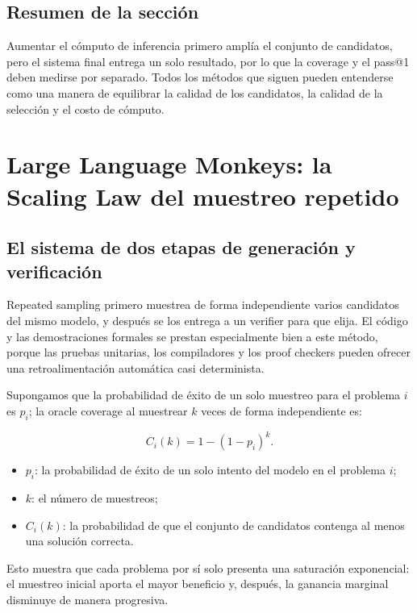 \documentclass[a4paper]{article}
\begin{document}
\subsection{Resumen de la sección}

Aumentar el cómputo de inferencia primero amplía el conjunto de candidatos, pero el sistema final entrega un solo resultado, por lo que la coverage y el pass@1 deben medirse por separado. Todos los métodos que siguen pueden entenderse como una manera de equilibrar la calidad de los candidatos, la calidad de la selección y el costo de cómputo.

\section{Large Language Monkeys: la Scaling Law del muestreo repetido}

\subsection{El sistema de dos etapas de generación y verificación}

Repeated sampling primero muestrea de forma independiente varios candidatos del mismo modelo, y después se los entrega a un verifier para que elija. El código y las demostraciones formales se prestan especialmente bien a este método, porque las pruebas unitarias, los compiladores y los proof checkers pueden ofrecer una retroalimentación automática casi determinista.


Supongamos que la probabilidad de éxito de un solo muestreo para el problema $i$ es $p_i$; la oracle coverage al muestrear $k$ veces de forma independiente es:

$$
C_i(k)=1-(1-p_i)^k.
$$

\begin{itemize}
    \item $p_i$: la probabilidad de éxito de un solo intento del modelo en el problema $i$;
    \item $k$: el número de muestreos;
    \item $C_i(k)$: la probabilidad de que el conjunto de candidatos contenga al menos una solución correcta.
\end{itemize}

Esto muestra que cada problema por sí solo presenta una saturación exponencial: el muestreo inicial aporta el mayor beneficio y, después, la ganancia marginal disminuye de manera progresiva.
\end{document}
